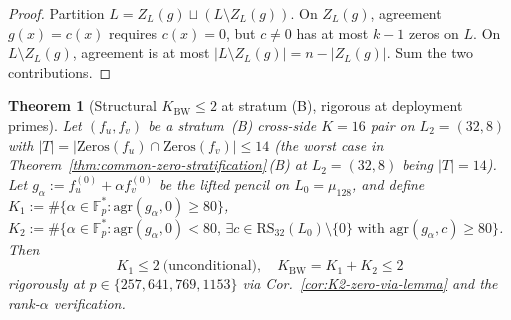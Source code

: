 \documentclass[11pt]{article}
\newtheorem{theorem}{Theorem}[section]
\theoremstyle{definition}
\theoremstyle{remark}
\newcommand{\FF}{\mathbb{F}}
\begin{document}
\begin{proof}
Partition $L = Z_L(g) \sqcup (L \setminus Z_L(g))$. On $Z_L(g)$, agreement
$g(x) = c(x)$ requires $c(x) = 0$, but $c \neq 0$ has at most $k - 1$ zeros
on $L$. On $L \setminus Z_L(g)$, agreement is at most $|L \setminus Z_L(g)|
= n - |Z_L(g)|$. Sum the two contributions.
\end{proof}

\begin{theorem}[Structural $K_{\mathrm{BW}} \leq 2$ at stratum (B), rigorous at deployment primes]
\label{thm:K-BW-2-structural}
Let $(f_u, f_v)$ be a stratum~(B) cross-side $K = 16$ pair on $L_2 = (32, 8)$
with $|T| = |\mathrm{Zeros}(f_u) \cap \mathrm{Zeros}(f_v)| \leq 14$ (the
worst case in Theorem~\ref{thm:common-zero-stratification}\,(B) at
$L_2 = (32, 8)$ being $|T| = 14$). Let
$g_\alpha := f_u^{(0)} + \alpha f_v^{(0)}$ be the lifted pencil on $L_0 = \mu_{128}$,
and define
$K_1 := \#\{\alpha \in \FF_p^* : \mathrm{agr}(g_\alpha, 0) \geq 80\}$,
$K_2 := \#\{\alpha \in \FF_p^* : \mathrm{agr}(g_\alpha, 0) < 80,\, \exists c \in \mathrm{RS}_{32}(L_0) \setminus \{0\}
\text{ with } \mathrm{agr}(g_\alpha, c) \geq 80\}$. Then
\[
K_1 \leq 2 \ \text{(unconditional)},
\quad
K_{\mathrm{BW}} = K_1 + K_2 \leq 2
\]
rigorously at $p \in \{257, 641, 769, 1153\}$ via
Cor.~\ref{cor:K2-zero-via-lemma} and the rank-$\alpha$ verification.
\end{theorem}
\end{document}
